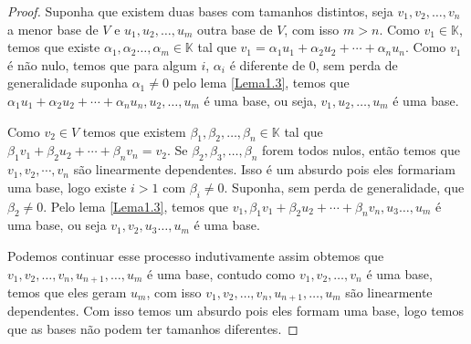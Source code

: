 \documentclass{article}
\newcommand{\KK}{\mathbb{K} }
\begin{document}
\begin{proof}
Suponha que existem duas bases com tamanhos distintos, seja $v_1,v_2,\dots,v_n$ a menor base de $V$ e $u_1,u_2,\dots,u_m$ outra base de $V$, com isso $m>n$.
Como $v_1 \in \KK$, temos que existe $\alpha_1,\alpha_2\dots,\alpha_m \in \KK$ tal que $v_1 = \alpha_1 u_1 + \alpha_2 u_2 + \cdots + \alpha_n u_n$.
Como $v_1$ é não nulo, temos que para algum $i$, $\alpha_i$ é diferente de 0, sem perda de generalidade suponha $\alpha_1 \ne 0$
 pelo lema \ref{Lema1.3}, temos que  $\alpha_1 u_1 + \alpha_2 u_2 + \cdots + \alpha_n u_n,u_2,\dots,u_m$ é uma base, ou seja, $v_1,u_2,\dots,u_m$ é uma base.
 
Como $v_2 \in V$ temos que existem $\beta_1,\beta_2,\dots,\beta_n \in \KK$ tal que $\beta_1 v_1 + \beta_2 u_2 + \cdots + \beta_n v_n = v_2$.
Se $\beta_2, \beta_3, \dots, \beta_n$ forem todos nulos, então temos que $v_1, v_2, \cdots, v_n$ são linearmente dependentes. Isso é um absurdo pois eles formariam uma base, logo existe $i>1$ com $\beta_i \neq 0$.
Suponha, sem perda de generalidade, que $\beta_2 \ne 0$. Pelo lema \ref{Lema1.3}, temos que $v_1,\beta_1 v_1 + \beta_2 u_2 + \cdots + \beta_n v_n,u_3\dots,u_m$ é uma base, ou seja $v_1,v_2,u_3\dots,u_m$ é uma base.

Podemos continuar esse processo indutivamente assim obtemos que $v_1,v_2,\dots,v_n,u_{n+1},\dots,u_m$ é uma base,
contudo como $v_1,v_2,\dots,v_n$ é uma base, temos que eles geram $u_m$, com isso $v_1,v_2,\dots,v_n,u_{n+1},\dots,u_m$ são linearmente dependentes. Com isso temos um absurdo pois eles formam uma base, logo temos que as bases não podem ter tamanhos diferentes.
\end{proof}
\end{document}
